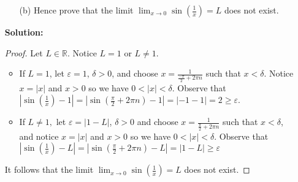 \documentclass[letterpaper,12pt]{article}
\theoremstyle{definition}
\begin{document}
\begin{enumerate}
    \item[] \begin{enumerate}
        \item[(b)] Hence prove that the limit $\lim_{x \rightarrow 0} \sin \left (\frac{1}{x} \right ) = L$ does not exist. 
        \end{enumerate}
\begin{mdframed}
    \textbf{Solution:} \begin{proof}
        Let $L \in \mathbb{R}$. Notice $L = 1$ or $L \neq 1$.
           \begin{itemize}
           \item If $L=1$, let $\varepsilon = 1$, $\delta > 0$, and choose $x = \frac{1}{\frac{-\pi}{2}+2\pi n}$ such that $x < \delta$.  Notice $x = |x|$ and $x > 0$ so we have $0 < |x| < \delta$. Observe that $\left |\sin \left ( \frac{1}{x} \right ) - 1 \right |=  \left | \sin \left (  \frac{\pi}{2}+2\pi n \right ) - 1\right | = |-1-1| = 2 \geq \varepsilon$.
          \item  If $L\neq 1,$ let $\varepsilon = |1-L|$, $\delta > 0$ and choose $x = \frac{1}{\frac{\pi}{2}+2\pi n}$ such that $x < \delta$, and notice $x = |x|$ and $x > 0$ so we have $0 < |x| < \delta$. Observe that $\left |\sin \left ( \frac{1}{x} \right ) - L \right |=  \left | \sin \left (  \frac{\pi}{2}+2\pi n \right ) - L\right | = |1-L| \geq \varepsilon$ 
           \end{itemize}
           It follows that the limit $\lim_{x \rightarrow 0} \sin \left (\frac{1}{x} \right ) = L$ does not exist.
    \end{proof}
\end{mdframed}
        \end{enumerate}
\end{document}
